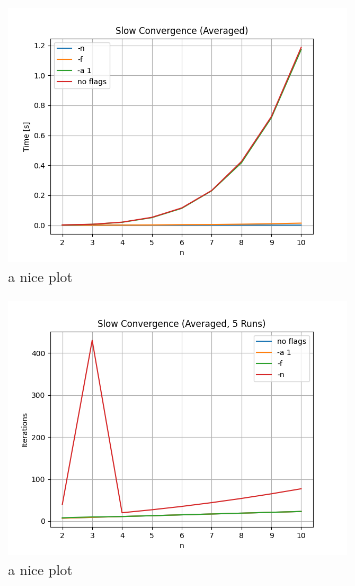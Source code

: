 \begin{figure}[ht]
	\centering
	\includegraphics[width=0.8\textwidth]{./Problems/slow_convergence/plots/time_small.png}
	\caption{a nice plot}
	\label{fig:slow:time_small}
\end{figure}

\begin{figure}[ht]
	\centering
	\includegraphics[width=0.8\textwidth]{./Problems/slow_convergence/plots/iterations_small.png}
	\caption{a nice plot}
	\label{fig:slow:iterations_small}
\end{figure}



